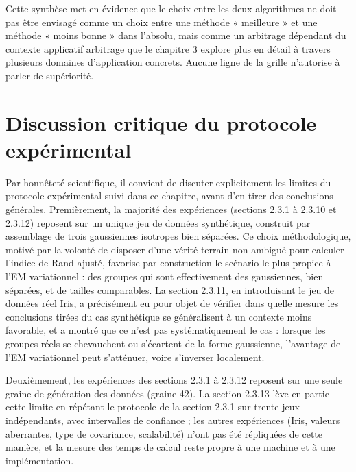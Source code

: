 Cette synthèse met en évidence que le choix entre les deux algorithmes ne doit pas être envisagé comme un choix entre une méthode « meilleure » et une méthode « moins bonne » dans l'absolu, mais comme un arbitrage dépendant du contexte applicatif  arbitrage que le chapitre 3 explore plus en détail à travers plusieurs domaines d'application concrets. Aucune ligne de la grille n'autorise à parler de supériorité.

\section{Discussion critique du protocole expérimental}
Par honnêteté scientifique, il convient de discuter explicitement les limites du protocole expérimental suivi dans ce chapitre, avant d'en tirer des conclusions générales. Premièrement, la majorité des expériences (sections 2.3.1 à 2.3.10 et 2.3.12) reposent sur un unique jeu de données synthétique, construit par assemblage de trois gaussiennes isotropes bien séparées. Ce choix méthodologique, motivé par la volonté de disposer d'une vérité terrain non ambiguë pour calculer l'indice de Rand ajusté, favorise par construction le scénario le plus propice à l'EM variationnel : des groupes qui sont effectivement des gaussiennes, bien séparées, et de tailles comparables. La section 2.3.11, en introduisant le jeu de données réel Iris, a précisément eu pour objet de vérifier dans quelle mesure les conclusions tirées du cas synthétique se généralisent à un contexte moins favorable, et a montré que ce n'est pas systématiquement le cas : lorsque les groupes réels se chevauchent ou s'écartent de la forme gaussienne, l'avantage de l'EM variationnel peut s'atténuer, voire s'inverser localement.

Deuxièmement, les expériences des sections 2.3.1 à 2.3.12 reposent sur une seule graine de génération des données (graine 42). La section 2.3.13 lève en partie cette limite en répétant le protocole de la section 2.3.1 sur trente jeux indépendants, avec intervalles de confiance ; les autres expériences (Iris, valeurs aberrantes, type de covariance, scalabilité) n'ont pas été répliquées de cette manière, et la mesure des temps de calcul reste propre à une machine et à une implémentation.

